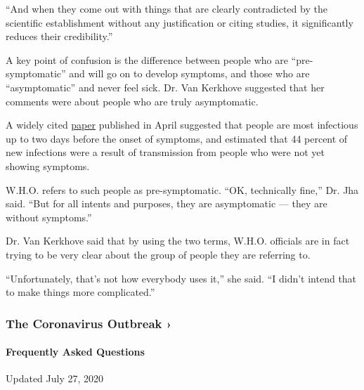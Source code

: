 ``And when they come out with things that are clearly contradicted by
the scientific establishment without any justification or citing
studies, it significantly reduces their credibility.''

A key point of confusion is the difference between people who are
``pre-symptomatic'' and will go on to develop symptoms, and those who
are ``asymptomatic'' and never feel sick. Dr. Van Kerkhove suggested
that her comments were about people who are truly asymptomatic.

A widely cited
\href{https://www.nature.com/articles/s41591-020-0869-5}{paper}
published in April suggested that people are most infectious up to two
days before the onset of symptoms, and estimated that 44 percent of new
infections were a result of transmission from people who were not yet
showing symptoms.

W.H.O. refers to such people as pre-symptomatic. ``OK, technically
fine,'' Dr. Jha said. ``But for all intents and purposes, they are
asymptomatic --- they are without symptoms.''

Dr. Van Kerkhove said that by using the two terms, W.H.O. officials are
in fact trying to be very clear about the group of people they are
referring to.

``Unfortunately, that's not how everybody uses it,'' she said. ``I
didn't intend that to make things more complicated.''

\href{https://www.nytimes.com/news-event/coronavirus?action=click\&pgtype=Article\&state=default\&region=MAIN_CONTENT_3\&context=storylines_faq}{}

\hypertarget{the-coronavirus-outbreak-}{%
\subsubsection{The Coronavirus Outbreak
›}\label{the-coronavirus-outbreak-}}

\hypertarget{frequently-asked-questions}{%
\paragraph{Frequently Asked
Questions}\label{frequently-asked-questions}}

Updated July 27, 2020

